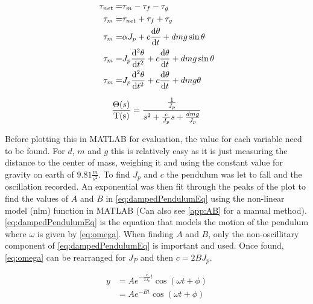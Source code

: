\documentclass[a4paper, 12pt, compsoc]{IEEEtran}
\begin{document}
        \begin{equation}\label{eq:secondOrderDE}
            \begin{split}    
                \tau_{net} = & \tau_m - \tau_f - \tau_g \\
                \tau_m = & \tau_{net} + \tau_f + \tau_g \\ 
                \tau_m = & \alpha J_p + c\dv{\theta}{t} + dmg\sin{\theta} \\ 
                \tau_m =  & J_p \dv[2]{\theta}{t} + c\dv{\theta}{t} + dmg\sin{\theta} \\
                \tau_m =  & J_p \dv[2]{\theta}{t} + c\dv{\theta}{t} + dmg\theta
            \end{split}
        \end{equation}

        \begin{equation}\label{eq:pendulumTF}
            \frac{\Theta(s)}{\rm T(s)} = \frac{\frac{1}{J_p}}{s^2 + \frac{c}{J_p}s + \frac{dmg}{J_p}}
        \end{equation}

        Before plotting this in MATLAB for evaluation, the value for each variable need to be found. For $d$, $m$ and $g$ this is relatively easy as it is just measuring the distance to the center of mass, weighing it and using the constant value for gravity on earth of $9.81 \frac{m}{s^2}$. To find $J_p$ and $c$ the pendulum was let to fall and the oscillation recorded. An exponential was then fit through the peaks of the plot to find the values of $A$ and $B$ in \cref{eq:dampedPendulumEq} using the non-linear model (nlm) function in MATLAB (Can also see \cref{app:AB} for a manual method). \cref{eq:dampedPendulumEq} is the equation that models the motion of the pendulum where $\omega$ is given by \cref{eq:omega}. When finding $A$ and $B$, only the non-oscillitary component of \cref{eq:dampedPendulumEq} is important and used. Once found, \cref{eq:omega} can be rearranged for $J_P$ and then $c = 2BJ_p$.
        
        \begin{equation}\label{eq:dampedPendulumEq}
            \begin{split}
                y & = A e^{-\frac{c}{2J_p}t} \cos(\omega t + \phi) \\
                  & = A e^{-Bt}\cos(\omega t + \phi) 
            \end{split}
        \end{equation}
\end{document}
